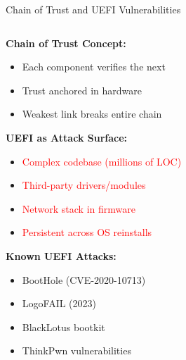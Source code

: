 \documentclass[aspectratio=169,12pt]{beamer}
\begin{document}
\begin{frame}{Chain of Trust and UEFI Vulnerabilities}
    \begin{columns}
        \begin{column}{0.5\textwidth}
            \textbf{Chain of Trust Concept:}
            \begin{itemize}
                \item Each component verifies the next
                \item Trust anchored in hardware
                \item Weakest link breaks entire chain
            \end{itemize}
            
            \vspace{0.3cm}
            \textbf{UEFI as Attack Surface:}
            \begin{itemize}
                \item \textcolor{red}{Complex codebase (millions of LOC)}
                \item \textcolor{red}{Third-party drivers/modules}
                \item \textcolor{red}{Network stack in firmware}
                \item \textcolor{red}{Persistent across OS reinstalls}
            \end{itemize}
            
            \vspace{0.3cm}
            \textbf{Known UEFI Attacks:}
            \begin{itemize}
                \item BootHole (CVE-2020-10713)
                \item LogoFAIL (2023)
                \item BlackLotus bootkit
                \item ThinkPwn vulnerabilities
            \end{itemize}
        \end{column}
        \begin{column}{0.5\textwidth}
\end{column}
\end{columns}
\end{frame}
\end{document}
